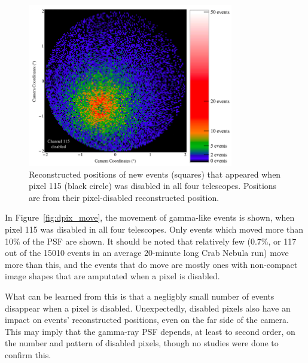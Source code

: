 \begin{figure}[!ht]
  \centering
  \includegraphics[width=0.8\textwidth]{images/disabled_pixel/appearing_events}
  \caption[New Events that Appear when Disabling Camera Pixels]{
    Reconstructed positions of new events (squares) that appeared when pixel 115 (black circle) was disabled in all four telescopes.
    Positions are from their pixel-disabled reconstructed position.
  }
  \label{fig:dpix_appear}
\end{figure}

In Figure~\ref{fig:dpix_move}, the movement of gamma-like events is shown, when pixel 115 was disabled in all four telescopes.
Only events which moved more than 10\% of the PSF are shown.
It should be noted that relatively few (0.7\%, or 117 out of the 15010 events in an average 20-minute long Crab Nebula run) move more than this, and the events that do move are mostly ones with non-compact image shapes that are amputated when a pixel is disabled.

What can be learned from this is that a negligbly small number of events disappear when a pixel is disabled.
Unexpectedly, disabled pixels also have an impact on events' reconstructed positions, even on the far side of the camera.
This may imply that the gamma-ray PSF depends, at least to second order, on the number and pattern of disabled pixels, though no studies were done to confirm this.


